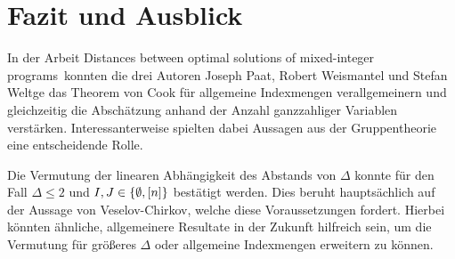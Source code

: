 \section{Fazit und Ausblick}

In der Arbeit \glqq Distances between optimal solutions of mixed-integer programs\grqq\ konnten die drei Autoren Joseph Paat,
Robert Weismantel und Stefan Weltge das Theorem von Cook für allgemeine Indexmengen verallgemeinern und gleichzeitig die Abschätzung anhand der Anzahl ganzzahliger Variablen verstärken.
Interessanterweise spielten dabei Aussagen aus der Gruppentheorie eine entscheidende Rolle.

Die Vermutung der linearen Abhängigkeit des Abstands von $\Delta$ konnte für den Fall $\Delta\leq 2$ und $I,J\in\{\emptyset,[n]\}$ bestätigt werden.
Dies beruht hauptsächlich auf der Aussage von Veselov-Chirkov, welche diese Voraussetzungen fordert.
Hierbei könnten ähnliche, allgemeinere Resultate in der Zukunft hilfreich sein, um die Vermutung für größeres $\Delta$ oder allgemeine Indexmengen erweitern zu können.

